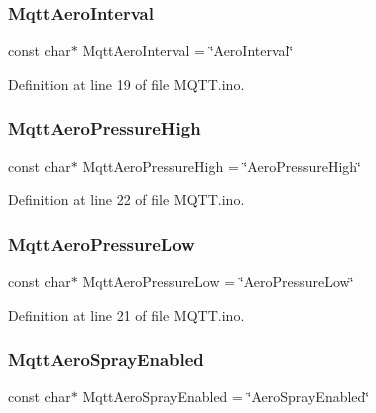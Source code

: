 \subsubsection{\texorpdfstring{MqttAeroInterval}{MqttAeroInterval}}
{\footnotesize\ttfamily const char$\ast$ Mqtt\+Aero\+Interval = \char`\"{}Aero\+Interval\char`\"{}}



Definition at line 19 of file M\+Q\+T\+T.\+ino.

\mbox{\label{_m_q_t_t_8ino_a16396abfa6768bb5f3d3229649b35cbd}} 
\subsubsection{\texorpdfstring{MqttAeroPressureHigh}{MqttAeroPressureHigh}}
{\footnotesize\ttfamily const char$\ast$ Mqtt\+Aero\+Pressure\+High = \char`\"{}Aero\+Pressure\+High\char`\"{}}



Definition at line 22 of file M\+Q\+T\+T.\+ino.

\mbox{\label{_m_q_t_t_8ino_a4d132761f4a34e3a7994eaa7e83bdae4}} 
\subsubsection{\texorpdfstring{MqttAeroPressureLow}{MqttAeroPressureLow}}
{\footnotesize\ttfamily const char$\ast$ Mqtt\+Aero\+Pressure\+Low = \char`\"{}Aero\+Pressure\+Low\char`\"{}}



Definition at line 21 of file M\+Q\+T\+T.\+ino.

\mbox{\label{_m_q_t_t_8ino_a4f2fb832c7989ffd521a0326b4485c72}} 
\subsubsection{\texorpdfstring{MqttAeroSprayEnabled}{MqttAeroSprayEnabled}}
{\footnotesize\ttfamily const char$\ast$ Mqtt\+Aero\+Spray\+Enabled = \char`\"{}Aero\+Spray\+Enabled\char`\"{}}



